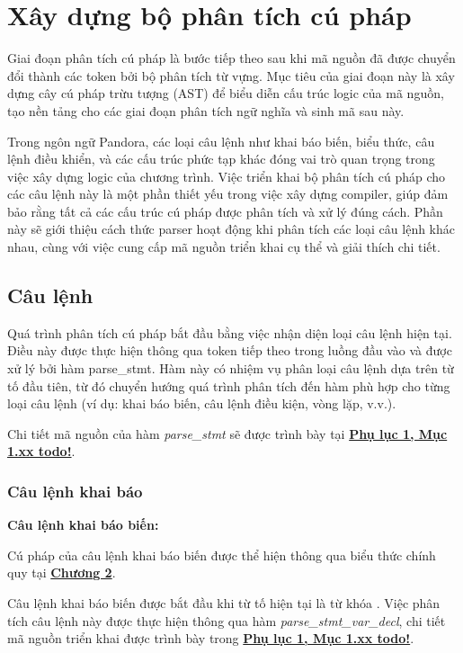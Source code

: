 \section{Xây dựng bộ phân tích cú pháp}
Giai đoạn phân tích cú pháp là bước tiếp theo sau khi mã nguồn đã được chuyển đổi thành các token bởi bộ phân tích từ vựng. Mục tiêu của giai đoạn này là xây dựng cây cú pháp trừu tượng (AST) để biểu diễn cấu trúc logic của mã nguồn, tạo nền tảng cho các giai đoạn phân tích ngữ nghĩa và sinh mã sau này. 

Trong ngôn ngữ Pandora, các loại câu lệnh như khai báo biến, biểu thức, câu lệnh điều khiển, và các cấu trúc phức tạp khác đóng vai trò quan trọng trong việc xây dựng logic của chương trình. Việc triển khai bộ phân tích cú pháp cho các câu lệnh này là một phần thiết yếu trong việc xây dựng compiler, giúp đảm bảo rằng tất cả các cấu trúc cú pháp được phân tích và xử lý đúng cách. Phần này sẽ giới thiệu cách thức parser hoạt động khi phân tích các loại câu lệnh khác nhau, cùng với việc cung cấp mã nguồn triển khai cụ thể và giải thích chi tiết.

\subsection{Câu lệnh}
Quá trình phân tích cú pháp bắt đầu bằng việc nhận diện loại câu lệnh hiện tại. Điều này được thực hiện thông qua token tiếp theo trong luồng đầu vào và được xử lý bởi hàm parse\_stmt. Hàm này có nhiệm vụ phân loại câu lệnh dựa trên từ tố đầu tiên, từ đó chuyển hướng quá trình phân tích đến hàm phù hợp cho từng loại câu lệnh (ví dụ: khai báo biến, câu lệnh điều kiện, vòng lặp, v.v.).

Chi tiết mã nguồn của hàm \textit{parse\_stmt} sẽ được trình bày tại \hyperref[ap1:simple_token]{\bf Phụ lục 1, Mục 1.xx todo!}. 
\subsubsection{Câu lệnh khai báo}
\textbf{Câu lệnh khai báo biến:}

Cú pháp của câu lệnh khai báo biến được thể hiện thông qua biểu thức chính quy tại \hyperref[ch2:decl_var_stmt]{\bf Chương 2}.

Câu lệnh khai báo biến được bắt đầu khi từ tố hiện tại là từ khóa . Việc phân tích câu lệnh này được thực hiện thông qua hàm \textit{parse\_stmt\_var\_decl}, chi tiết mã nguồn triển khai được trình bày trong \hyperref[ap1:simple_token]{\bf Phụ lục 1, Mục 1.xx todo!}.

